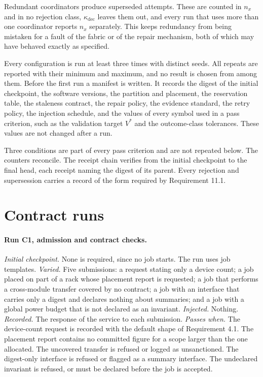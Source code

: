 \documentclass[11pt,openany]{book}
\theoremstyle{remark}
\begin{document}
Redundant coordinators produce superseded attempts. These are counted in $n_x$ and in no rejection class, $\kappa_{\mathrm{dec}}$ leaves them out, and every run that uses more than one coordinator reports $n_x$ separately. This keeps redundancy from being mistaken for a fault of the fabric or of the repair mechanism, both of which may have behaved exactly as specified.

Every configuration is run at least three times with distinct seeds. All repeats are reported with their minimum and maximum, and no result is chosen from among them. Before the first run a manifest is written. It records the digest of the initial checkpoint, the software versions, the partition and placement, the reservation table, the staleness contract, the repair policy, the evidence standard, the retry policy, the injection schedule, and the values of every symbol used in a pass criterion, such as the validation target $V^{*}$ and the outcome-class tolerances. These values are not changed after a run.

Three conditions are part of every pass criterion and are not repeated below. The counters reconcile. The receipt chain verifies from the initial checkpoint to the final head, each receipt naming the digest of its parent. Every rejection and supersession carries a record of the form required by Requirement 11.1.

\section{Contract runs}

\paragraph{Run C1, admission and contract checks.} \emph{Initial checkpoint.} None is required, since no job starts. The run uses job templates. \emph{Varied.} Five submissions: a request stating only a device count; a job placed on part of a rack whose placement report is requested; a job that performs a cross-module transfer covered by no contract; a job with an interface that carries only a digest and declares nothing about summaries; and a job with a global power budget that is not declared as an invariant. \emph{Injected.} Nothing. \emph{Recorded.} The response of the service to each submission. \emph{Passes when.} The device-count request is recorded with the default shape of Requirement 4.1. The placement report contains no committed figure for a scope larger than the one allocated. The uncovered transfer is refused or logged as unsanctioned. The digest-only interface is refused or flagged as a summary interface. The undeclared invariant is refused, or must be declared before the job is accepted.
\end{document}
